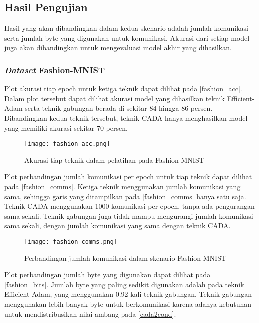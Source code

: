 \subsection{Hasil Pengujian}

Hasil yang akan dibandingkan dalam kedua skenario adalah jumlah komunikasi serta jumlah byte yang digunakan untuk komunikasi. Akurasi dari setiap model juga akan dibandingkan untuk mengevaluasi model akhir yang dihasilkan.

\subsubsection{\emph{Dataset} Fashion-MNIST}

Plot akurasi tiap epoch untuk ketiga teknik dapat dilihat pada \autoref{fashion_acc}. Dalam plot tersebut dapat dilihat akurasi model yang dihasilkan teknik Efficient-Adam serta teknik gabungan berada di sekitar 84 hingga 86 persen. Dibandingkan kedua teknik tersebut, teknik CADA hanya menghasilkan model yang memiliki akurasi sekitar 70 persen.

\begin{figure}[H]
  \centering
  \texttt{[image: fashion\_acc.png]}
  \caption{Akurasi tiap teknik dalam pelatihan pada Fashion-MNIST}\label{fashion_acc}
\end{figure}

Plot perbandingan jumlah komunikasi per epoch untuk tiap teknik dapat dilihat pada \autoref{fashion_comms}. Ketiga teknik menggunakan jumlah komunikasi yang sama, sehingga garis yang ditampilkan pada \autoref{fashion_comms} hanya satu saja. Teknik CADA menggunakan 1000 komunikasi per epoch, tanpa ada pengurangan sama sekali. Teknik gabungan juga tidak mampu mengurangi jumlah komunikasi sama sekali, dengan jumlah komunikasi yang sama dengan teknik CADA.

\begin{figure}[H]
  \centering
  \texttt{[image: fashion\_comms.png]}
  \caption{Perbandingan jumlah komunikasi dalam skenario Fashion-MNIST}\label{fashion_comms}
\end{figure}

Plot perbandingan jumlah byte yang digunakan dapat dilihat pada \autoref{fashion_bits}. Jumlah byte yang paling sedikit digunakan adalah pada teknik Efficient-Adam, yang menggunakan 0.92 kali teknik gabungan. Teknik gabungan menggunakan lebih banyak byte untuk berkomunikasi karena adanya kebutuhan untuk mendistribusikan nilai ambang pada \autoref{cada2cond}.

